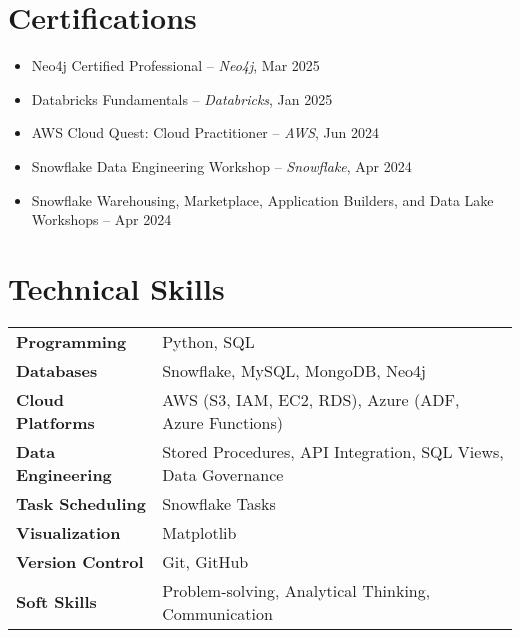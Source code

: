 \documentclass[11pt,a4paper]{article}
\begin{document}



\section*{Certifications}

\begin{itemize}
  \item Neo4j Certified Professional – \textit{Neo4j}, Mar 2025
  \item Databricks Fundamentals – \textit{Databricks}, Jan 2025
  \item AWS Cloud Quest: Cloud Practitioner – \textit{AWS}, Jun 2024
  \item Snowflake Data Engineering Workshop – \textit{Snowflake}, Apr 2024
  \item Snowflake Warehousing, Marketplace, Application Builders, and Data Lake Workshops – Apr 2024
\end{itemize}

\section*{Technical Skills}

\begin{tabular}{@{}ll}
\textbf{Programming}       & Python, SQL \\[6pt]
\textbf{Databases}         & Snowflake, MySQL, MongoDB, Neo4j \\[6pt]
\textbf{Cloud Platforms}   & AWS (S3, IAM, EC2, RDS), Azure (ADF, Azure Functions) \\[6pt]
\textbf{Data Engineering}  & Stored Procedures, API Integration, SQL Views, Data Governance \\[6pt]
\textbf{Task Scheduling}   & Snowflake Tasks \\[6pt]
\textbf{Visualization}     & Matplotlib \\[6pt]
\textbf{Version Control}   & Git, GitHub \\[6pt]
\textbf{Soft Skills}       & Problem-solving, Analytical Thinking, Communication
\end{tabular}
\end{document}
